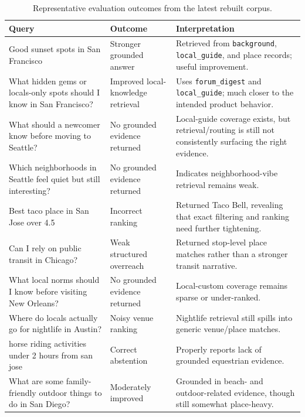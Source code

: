 \documentclass[11pt]{article}
\begin{document}
\begin{table}[H]
\centering
\caption{Representative evaluation outcomes from the latest rebuilt corpus.}
\label{tab:eval}
\small
\begin{tabularx}{\textwidth}{>{\raggedright\arraybackslash}p{} >{\raggedright\arraybackslash}p{} >{\raggedright\arraybackslash}X}
\toprule
Query & Outcome & Interpretation \\
\midrule
Good sunset spots in San Francisco & Stronger grounded answer & Retrieved from \texttt{background}, \texttt{local\_guide}, and place records; useful improvement. \\
What hidden gems or locals-only spots should I know in San Francisco? & Improved local-knowledge retrieval & Uses \texttt{forum\_digest} and \texttt{local\_guide}; much closer to the intended product behavior. \\
What should a newcomer know before moving to Seattle? & No grounded evidence returned & Local-guide coverage exists, but retrieval/routing is still not consistently surfacing the right evidence. \\
Which neighborhoods in Seattle feel quiet but still interesting? & No grounded evidence returned & Indicates neighborhood-vibe retrieval remains weak. \\
Best taco place in San Jose over 4.5 & Incorrect ranking & Returned Taco Bell, revealing that exact filtering and ranking need further tightening. \\
Can I rely on public transit in Chicago? & Weak structured overreach & Returned stop-level place matches rather than a stronger transit narrative. \\
What local norms should I know before visiting New Orleans? & No grounded evidence returned & Local-custom coverage remains sparse or under-ranked. \\
Where do locals actually go for nightlife in Austin? & Noisy venue ranking & Nightlife retrieval still spills into generic venue/place matches. \\
horse riding activities under 2 hours from san jose & Correct abstention & Properly reports lack of grounded equestrian evidence. \\
What are some family-friendly outdoor things to do in San Diego? & Moderately improved & Grounded in beach- and outdoor-related evidence, though still somewhat place-heavy. \\
\bottomrule
\end{tabularx}
\end{table}
\end{document}
